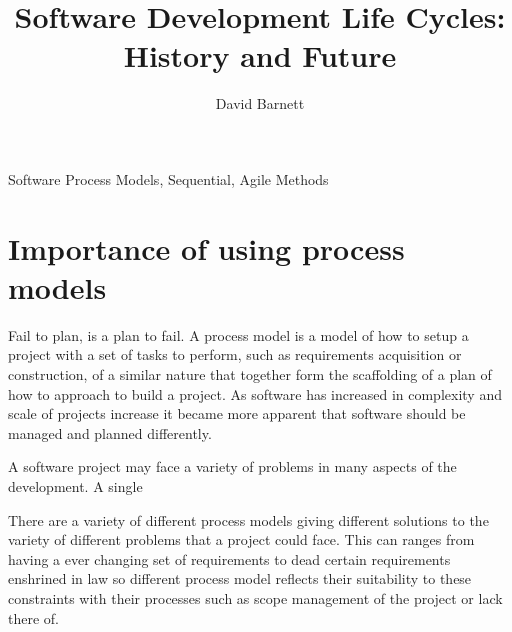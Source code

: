 \documentclass{style/CRPITStyle}
\renewcommand{\cite}{\citep}
\begin{document}
\title{Software Development Life Cycles: History and Future}
\author{David Barnett}

\maketitle

\begin{abstract}
\end{abstract}
\vspace{.1in}

 Software Process Models, Sequential, Agile Methods

\vspace{.1in}


\section{Importance of using process models}
Fail to plan, is a plan to fail. 
A process model is a model of how to setup a project with a set of tasks to perform,
such as requirements acquisition or construction, of a similar nature that together form 
the scaffolding of a plan of how to approach to build a project.
As software has increased in complexity and scale of projects increase it
became more apparent that software should be managed and planned differently.
\cite{nato:1969}

\vspace{.1in}

A software project may face a variety of problems in many aspects of the
development. A single  

There are a variety of different process models giving different solutions to
the variety of different problems that a project could face. This can ranges from
having a ever changing set of requirements to dead certain requirements
enshrined in law so different process model reflects their suitability to these constraints
with their processes such as scope management of the project or lack there of.
\end{document}
